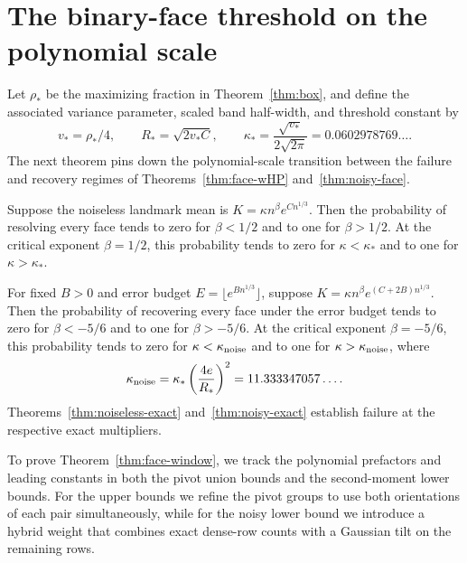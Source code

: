 \section{The binary-face threshold on the polynomial scale}
Let \(\rho_*\) be the maximizing fraction in Theorem~\ref{thm:box}, and define the associated variance parameter, scaled band half-width, and threshold constant by
\[
 v_* = \rho_*/4,\qquad R_* = \sqrt{2v_* C},\qquad
 \kappa_* = \frac{\sqrt{v_*}}{2\sqrt{2\pi}}=0.0602978769\ldots.
\]
The next theorem pins down the polynomial-scale transition between the failure and recovery regimes of Theorems~\ref{thm:face-wHP} and~\ref{thm:noisy-face}.

\begin{theorem}\label{thm:face-window}
Suppose the noiseless landmark mean is \(K=\kappa n^\beta e^{Cn^{1/3}}\). Then the probability of resolving every face tends to zero for \(\beta<1/2\) and to one for \(\beta>1/2\). At the critical exponent \(\beta=1/2\), this probability tends to zero for \(\kappa<\kappa_*\) and to one for \(\kappa>\kappa_*\).

For fixed \(B>0\) and error budget \(E=\lfloor e^{Bn^{1/3}}\rfloor\), suppose \(K=\kappa n^\beta e^{(C+2B)n^{1/3}}\). Then the probability of recovering every face under the error budget tends to zero for \(\beta<-5/6\) and to one for \(\beta>-5/6\). At the critical exponent \(\beta=-5/6\), this probability tends to zero for \(\kappa<\kappa_{\rm noise}\) and to one for \(\kappa>\kappa_{\rm noise}\), where
\[
 \kappa_{\rm noise}=\kappa_*\left(\frac{4e}{R_*}\right)^2
 =11.333347057\ldots .
\]
Theorems~\ref{thm:noiseless-exact} and~\ref{thm:noisy-exact} establish failure at the respective exact multipliers.
\end{theorem}

To prove Theorem~\ref{thm:face-window}, we track the polynomial prefactors and leading constants in both the pivot union bounds and the second-moment lower bounds. For the upper bounds we refine the pivot groups to use both orientations of each pair simultaneously, while for the noisy lower bound we introduce a hybrid weight that combines exact dense-row counts with a Gaussian tilt on the remaining rows.

